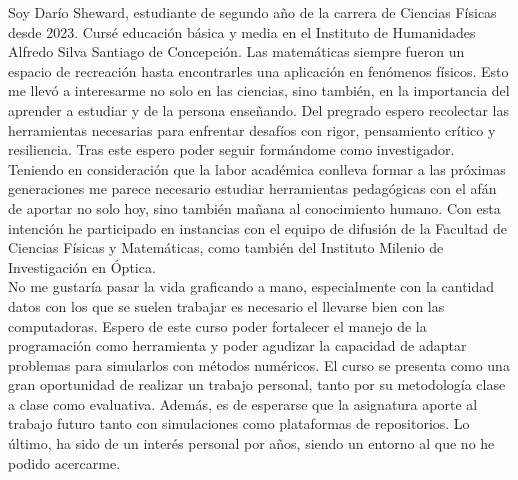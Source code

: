 \documentclass[../portafolio.tex]{subfiles}
\begin{document}
Soy Darío Sheward, estudiante de segundo año de la carrera de Ciencias Físicas desde 2023. Cursé educación básica y media en el Instituto de Humanidades Alfredo Silva Santiago de Concepción. Las matemáticas siempre fueron un espacio de recreación hasta encontrarles una aplicación en fenómenos físicos. Esto me llevó a interesarme no solo en las ciencias, sino también, en la importancia del aprender a estudiar y de la persona enseñando. Del pregrado espero recolectar las herramientas necesarias para enfrentar desafíos con rigor, pensamiento crítico y resiliencia. Tras este espero poder seguir formándome como investigador. Teniendo en consideración que la labor académica conlleva formar a las próximas generaciones me parece necesario estudiar herramientas pedagógicas con el afán de aportar no solo hoy, sino también mañana al conocimiento humano. Con esta intención he participado en instancias con el equipo de difusión de la Facultad de Ciencias Físicas y Matemáticas, como también del Instituto Milenio de Investigación en Óptica.\\


No me gustaría pasar la vida graficando a mano, especialmente con la cantidad datos con los que se suelen trabajar es necesario el llevarse bien con las computadoras. Espero de este curso poder fortalecer el manejo de la programación como herramienta y poder agudizar la capacidad de adaptar problemas para simularlos con métodos numéricos. El curso se presenta como una gran oportunidad de realizar un trabajo personal, tanto por su metodología clase a clase como evaluativa. Además, es de esperarse que la asignatura aporte al trabajo futuro tanto con simulaciones como plataformas de repositorios. Lo último, ha sido de un interés personal por años, siendo un entorno al que no he podido acercarme. \\
\end{document}
